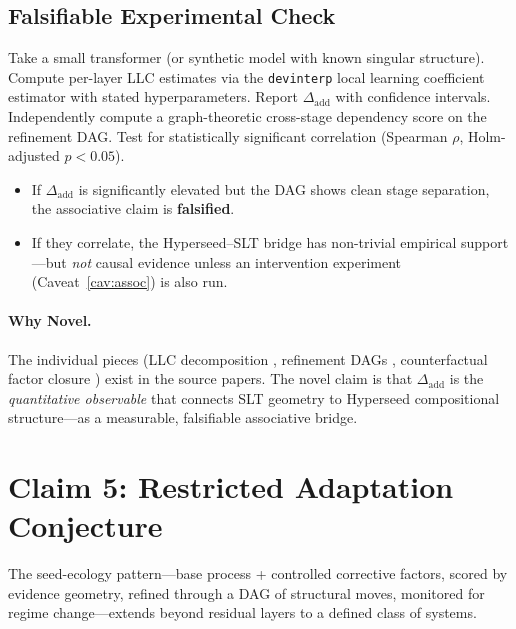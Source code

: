 \documentclass[11pt,a4paper]{article}
\theoremstyle{definition}
\theoremstyle{remark}
\newcommand{\Dadd}{\Delta_{\mathrm{add}}}
\begin{document}
\subsection{Falsifiable Experimental Check}

Take a small transformer (or synthetic model with known singular structure).
Compute per-layer LLC estimates via the \texttt{devinterp} local learning
coefficient estimator with stated hyperparameters.  Report $\Dadd$ with
confidence intervals.  Independently compute a graph-theoretic cross-stage
dependency score on the refinement DAG.  Test for statistically significant
correlation (Spearman $\rho$, Holm-adjusted $p < 0.05$).

\begin{itemize}
  \item If $\Dadd$ is significantly elevated but the DAG shows clean stage
    separation, the associative claim is \textbf{falsified}.
  \item If they correlate, the Hyperseed--SLT bridge has non-trivial empirical
    support---but \emph{not} causal evidence unless an intervention experiment
    (Caveat~\ref{cav:assoc}) is also run.
\end{itemize}

\paragraph{Why Novel.}
The individual pieces (LLC decomposition \cite{Weakness-SL,SLT-SubRep},
refinement DAGs \cite{Weakness-SL}, counterfactual factor closure
\cite{CausalFibres}) exist in the source papers.  The novel claim is that
$\Dadd$ is the \emph{quantitative observable} that connects SLT geometry to
Hyperseed compositional structure---as a measurable, falsifiable associative
bridge.

\section{Claim 5: Restricted Adaptation Conjecture}\label{sec:claim5}

The seed-ecology pattern---base process + controlled corrective factors, scored
by evidence geometry, refined through a DAG of structural moves, monitored for
regime change---extends beyond residual layers to a defined class of systems.
\end{document}
